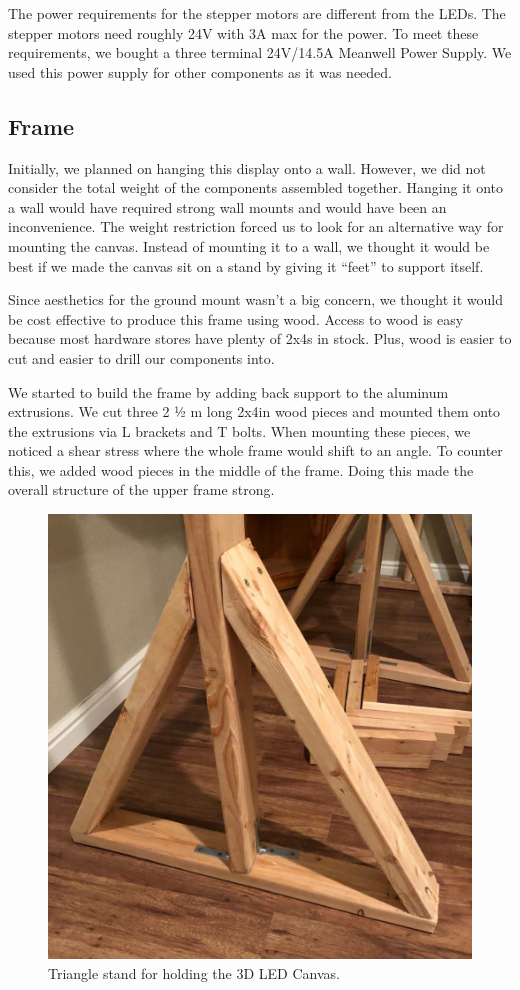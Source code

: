 \documentclass[11pt]{IEEEtran}
\begin{document}
The power requirements for the stepper motors are different from the LEDs. The stepper motors need roughly 24V with 3A max for the power. To meet these requirements, we bought a three terminal 24V/14.5A Meanwell Power Supply. We used this power supply for other components as it was needed.

\subsection{Frame}
Initially, we planned on hanging this display onto a wall. However, we did not consider the total weight of the components assembled together. Hanging it onto a wall would have required strong wall mounts and would have been an inconvenience. The weight restriction forced us to look for an alternative way for mounting the canvas. Instead of mounting it to a wall, we thought it would be best if we made the canvas sit on a stand by giving it “feet” to support itself. 

Since aesthetics for the ground mount wasn’t a big concern, we thought it would be cost effective to produce this frame using wood. Access to wood is easy because most hardware stores have plenty of 2x4s in stock. Plus, wood is easier to cut and easier to drill our components into.

We started to build the frame by adding back support to the aluminum extrusions. We cut three 2 ½ m long 2x4in wood pieces and mounted them onto the extrusions via L brackets and T bolts. When mounting these pieces, we noticed a shear stress where the whole frame would shift to an angle. To counter this, we added wood pieces in the middle of the frame. Doing this made the overall structure of the upper frame strong.

\begin{figure}
  \centering
  \includegraphics[width=\columnwidth]{image5.png}
  \caption{Triangle stand for holding the 3D LED Canvas.}
  \label{fig:framelegs}
\end{figure}
\end{document}
